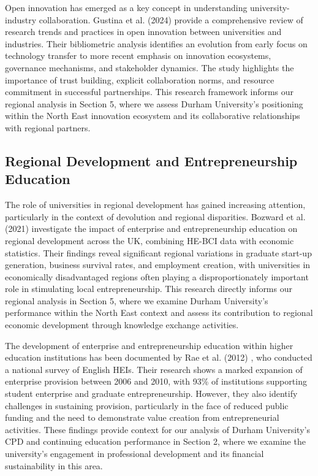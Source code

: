\documentclass[journal,onecolumn, 10pt,draftclsnofoot]{IEEEtran}
\begin{document}
Open innovation has emerged as a key concept in understanding university-industry collaboration. Gustina et al. (2024) \cite{gustina2024open} provide a comprehensive review of research trends and practices in open innovation between universities and industries. Their bibliometric analysis identifies an evolution from early focus on technology transfer to more recent emphasis on innovation ecosystems, governance mechanisms, and stakeholder dynamics. The study highlights the importance of trust building, explicit collaboration norms, and resource commitment in successful partnerships. This research framework informs our regional analysis in Section 5, where we assess Durham University's positioning within the North East innovation ecosystem and its collaborative relationships with regional partners.

\subsection{Regional Development and Entrepreneurship Education}

The role of universities in regional development has gained increasing attention, particularly in the context of devolution and regional disparities. Bozward et al. (2021) \cite{bozward2021impact} investigate the impact of enterprise and entrepreneurship education on regional development across the UK, combining HE-BCI data with economic statistics. Their findings reveal significant regional variations in graduate start-up generation, business survival rates, and employment creation, with universities in economically disadvantaged regions often playing a disproportionately important role in stimulating local entrepreneurship. This research directly informs our regional analysis in Section 5, where we examine Durham University's performance within the North East context and assess its contribution to regional economic development through knowledge exchange activities.

The development of enterprise and entrepreneurship education within higher education institutions has been documented by Rae et al. (2012) \cite{rae2012enterprise}, who conducted a national survey of English HEIs. Their research shows a marked expansion of enterprise provision between 2006 and 2010, with 93\% of institutions supporting student enterprise and graduate entrepreneurship. However, they also identify challenges in sustaining provision, particularly in the face of reduced public funding and the need to demonstrate value creation from entrepreneurial activities. These findings provide context for our analysis of Durham University's CPD and continuing education performance in Section 2, where we examine the university's engagement in professional development and its financial sustainability in this area.
\end{document}
